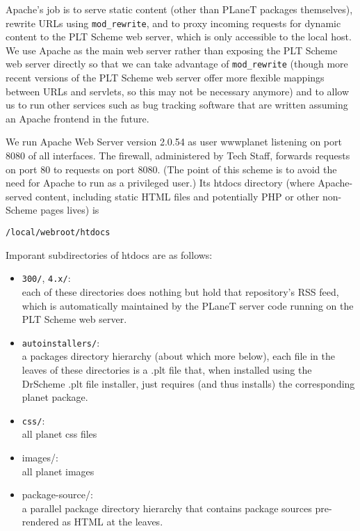 \documentclass{article}
\begin{document}
Apache's job is to serve static content (other than PLaneT packages
themselves), rewrite URLs using \texttt{mod\_rewrite}, and to proxy incoming
requests for dynamic content to the PLT Scheme web server, which is
only accessible to the local host. We use Apache as the main web
server rather than exposing the PLT Scheme web server directly so that
we can take advantage of \texttt{mod\_rewrite} (though more recent versions of
the PLT Scheme web server offer more flexible mappings between URLs
and servlets, so this may not be necessary anymore) and to allow us to
run other services such as bug tracking software that are written
assuming an Apache frontend in the future.

We run Apache Web Server version 2.0.54 as user wwwplanet listening
on port 8080 of all interfaces. The firewall, administered by Tech
Staff, forwards requests on port 80 to requests on port 8080. (The
point of this scheme is to avoid the need for Apache to run as a
privileged user.)  Its htdocs directory (where Apache-served content,
including static HTML files and potentially PHP or other non-Scheme
pages lives) is

  \texttt{/local/webroot/htdocs}

Imporant subdirectories of htdocs are as follows:

\begin{itemize}
\item \texttt{300/}, \texttt{4.x/}:  \\
each of these directories does nothing but hold that repository's RSS
  feed, which is automatically maintained by the PLaneT server code
  running on the PLT Scheme web server.

\item \texttt{autoinstallers/}: \\
a packages directory hierarchy (about which more below), each file in
  the leaves of these directories is a .plt file that, when installed
  using the DrScheme .plt file installer, just requires (and thus
  installs) the corresponding planet package.
\item \texttt{css/}: \\
all planet css files
\item {images/:} \\
all planet images
\item {package-source/}: \\
a parallel package directory hierarchy that contains package sources
pre-rendered as HTML at the leaves.
\end{itemize}
\end{document}

